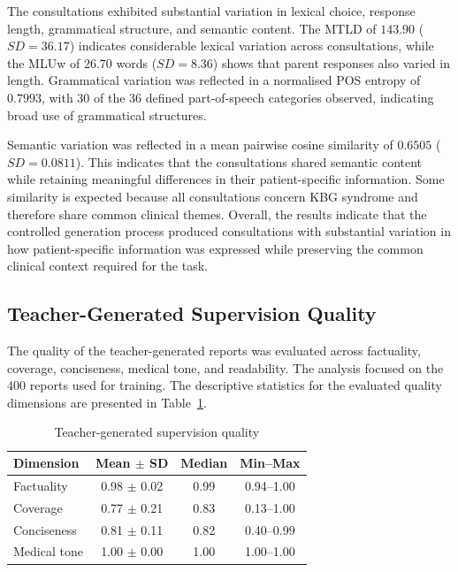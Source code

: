 \documentclass[ %
                    author={Aman Kumar Singh},
                supervisor={Dr. Edwin Simpson},
                    degree={MSc},
                     title={Quality-Aware Knowledge Distillation of Large Language Models for Efficient Personalised Clinical Report Generation},
                  subtitle={},
                      type={},
                      year={2021}]{dissertation}
\begin{document}
The consultations exhibited substantial variation in lexical choice,
response length, grammatical structure, and semantic content. The MTLD
of $143.90$ ($SD=36.17$) indicates considerable lexical variation across
consultations, while the MLUw of $26.70$ words ($SD=8.36$) shows that
parent responses also varied in length. Grammatical variation was reflected
in a normalised POS entropy of $0.7993$, with 30 of the 36 defined
part-of-speech categories observed, indicating broad use of grammatical
structures.

Semantic variation was reflected in a mean pairwise cosine similarity of
$0.6505$ ($SD=0.0811$). This indicates that the consultations shared
semantic content while retaining meaningful differences in their
patient-specific information. Some similarity is expected because all
consultations concern KBG syndrome and therefore share common clinical
themes. Overall, the results indicate that the controlled generation
process produced consultations with substantial variation in how
patient-specific information was expressed while preserving the common
clinical context required for the task.
\subsection{Teacher-Generated Supervision Quality}
\label{sec:teacher_supervision_quality}

The quality of the teacher-generated reports was evaluated across
factuality, coverage, conciseness, medical tone, and readability. The
analysis focused on the 400 reports used for training. The descriptive
statistics for the evaluated quality dimensions are presented in
Table~\ref{tab:teacher_quality}.
\vspace{-15pt}

\begin{table}[htbp]
\centering
\footnotesize
\caption{Teacher-generated supervision quality}
\label{tab:teacher_quality}
\begin{tabular}{lccc}
\hline
\textbf{Dimension} & \textbf{Mean $\pm$ SD} & \textbf{Median} & \textbf{Min--Max} \\
\hline
Factuality   & 0.98 $\pm$ 0.02 & 0.99 & 0.94--1.00 \\
Coverage     & 0.77 $\pm$ 0.21 & 0.83 & 0.13--1.00 \\
Conciseness  & 0.81 $\pm$ 0.11 & 0.82 & 0.40--0.99 \\
Medical tone & 1.00 $\pm$ 0.00 & 1.00 & 1.00--1.00 \\
\hline
\end{tabular}
\end{table}
\end{document}
